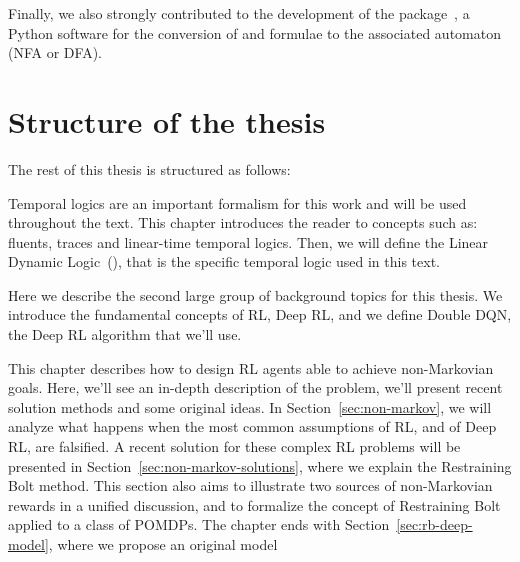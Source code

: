 Finally, we also strongly contributed to the development of the 
package~\cite{bib:flloat}, a Python software for the conversion of \ltl{} and
\ldl{} formulae to the associated automaton (NFA or DFA).


\section{Structure of the thesis}

The rest of this thesis is structured as follows:
\begin{description}[style=nextline]
	\item[\ref{ch:logics}~--~\nameref{ch:logics}]
		Temporal logics are an important formalism for this work and will be used
		throughout the text. This chapter introduces the reader to concepts such
		as: fluents, traces and linear-time temporal logics. Then, we will define
		the Linear Dynamic Logic~(\ldl{}), that is the specific temporal logic
		used in this text.
	\item[\ref{ch:rl}~--~\nameref{ch:rl}]
		Here we describe the second large group of background topics for this
		thesis. We introduce the fundamental concepts of RL, Deep RL, and we
		define Double DQN, the Deep RL algorithm that we'll use.
	\item[\ref{ch:nonmarkovrl}~--~\nameref{ch:nonmarkovrl}]
		This chapter describes how to design RL agents able to achieve
		non-Markovian goals. Here, we'll see an in-depth description of the
		problem, we'll present recent solution methods and some
		original ideas. In Section~\ref{sec:non-markov}, we will analyze what
		happens when the most common assumptions of RL, and of Deep RL, are
		falsified. A recent solution for these complex RL problems will be
		presented in Section~\ref{sec:non-markov-solutions}, where we explain the
		Restraining Bolt method.
		This section also aims to illustrate two sources
		of non-Markovian rewards in a unified discussion, and to formalize the
		concept of Restraining Bolt applied to a class of POMDPs.
		The chapter ends
		with Section~\ref{sec:rb-deep-model}, where we propose an original model

\end{description}
